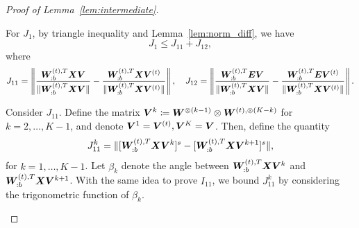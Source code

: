 \documentclass[lettersize,onecolumn,journal]{IEEEtran}
\theoremstyle{definition}
\theoremstyle{definition}
\def\fixme#1#2{\textbf{\color{red}[FIXME (#1): #2]}}
\begin{document}
\begin{proof}[Proof of Lemma~\ref{lem:intermediate}]
\begin{enumerate}
    For $J_1$, by triangle inequality and Lemma~\ref{lem:norm_diff}, we have 
    \begin{equation}
        J_1 \leq J_{11} + J_{12},
    \end{equation}
    where 
    \begin{equation}
        J_{11} =  \left\lVert \frac{\bm{W}_{:b}^{(t),T} \bm X \bm{V} }{\lVert \bm{W}_{:b}^{(t),T} \bm X \bm{V} \rVert} - \frac{\bm{W}_{:b}^{(t),T} \bm X \bm{V}^{(t)} }{\lVert \bm{W}_{:b}^{(t),T} \bm X \bm{V}^{(t)} \rVert}  \right\rVert, \quad J_{12} =  \left\lVert \frac{\bm{W}_{:b}^{(t),T}  \bm{E} \bm{V}}{ \lVert\bm{W}_{:b}^{(t),T}  \bm X \bm{V}\rVert } - \frac{\bm{W}_{:b}^{(t),T}  \bm{E} \bm{V}^{(t)}}{ \lVert\bm{W}_{:b}^{(t),T}  \bm X \bm{V}^{(t)}\rVert }   \right\rVert.
    \end{equation}
    
    
    Consider $J_{11}$.  Define the matrix $\bm{V}^{k} \coloneqq \bm{W}^{\otimes (k-1)} \otimes \bm{W}^{(t), \otimes (K-k)}$ for $k = 2,\ldots, K-1$, and denote $\bm{V}^1 = \bm{V}^{(t)}, \bm{V}^K = \bm{V}$. Then, define the quantity
    \begin{equation}
        J_{11}^k = \lVert [\bm{W}_{:b}^{(t),T} \bm X \bm{V}^k ]^s - [\bm{W}_{:b}^{(t),T} \bm X \bm{V}^{k+1} ]^s \rVert,
     \end{equation}
    for $k = 1,\ldots, K-1$. Let $\beta_k$ denote the angle between $\bm{W}_{:b}^{(t),T} \bm X \bm{V}^k$ and $\bm{W}_{:b}^{(t),T} \bm X \bm{V}^{k+1}$. With the same idea to prove $I_{11}$, we bound $J_{11}^k$ by considering the trigonometric function of $\beta_k$. 
    

\end{enumerate}
\end{proof}
\end{document}
